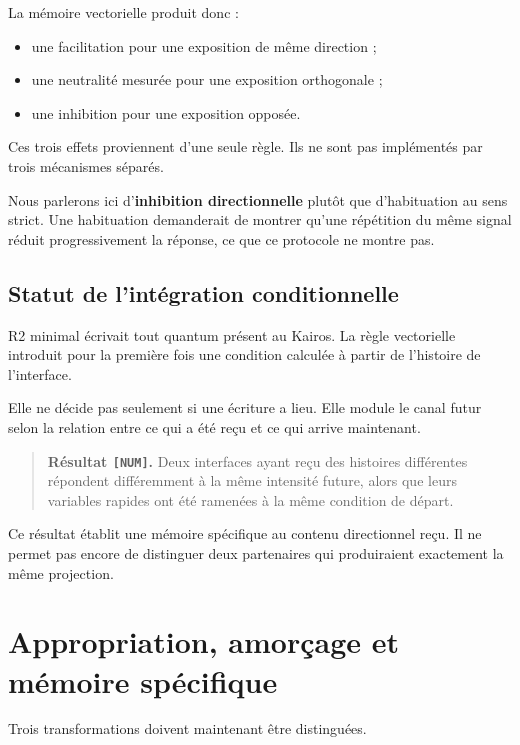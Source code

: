 La mémoire vectorielle produit donc :

\begin{itemize}
\tightlist
\item
  une facilitation pour une exposition de même direction ;
\item
  une neutralité mesurée pour une exposition orthogonale ;
\item
  une inhibition pour une exposition opposée.
\end{itemize}

Ces trois effets proviennent d'une seule règle. Ils ne sont pas
implémentés par trois mécanismes séparés.

Nous parlerons ici d'\textbf{inhibition directionnelle} plutôt que
d'habituation au sens strict. Une habituation demanderait de montrer
qu'une répétition du même signal réduit progressivement la réponse, ce
que ce protocole ne montre pas.

\section{Statut de l'intégration conditionnelle}\label{t2-statut-de-lintegration-conditionnelle}

R2 minimal écrivait tout quantum présent au Kairos. La règle vectorielle
introduit pour la première fois une condition calculée à partir de
l'histoire de l'interface.

Elle ne décide pas seulement si une écriture a lieu. Elle module le
canal futur selon la relation entre ce qui a été reçu et ce qui arrive
maintenant.

\begin{quote}
\textbf{Résultat \texttt{{[}NUM{]}}.} Deux interfaces ayant reçu des
histoires différentes répondent différemment à la même intensité future,
alors que leurs variables rapides ont été ramenées à la même condition
de départ.
\end{quote}

Ce résultat établit une mémoire spécifique au contenu directionnel reçu.
Il ne permet pas encore de distinguer deux partenaires qui produiraient
exactement la même projection.

\chapter{Appropriation, amorçage et mémoire spécifique}\label{t2-appropriation-amorcage-et-memoire-specifique}

Trois transformations doivent maintenant être distinguées.

